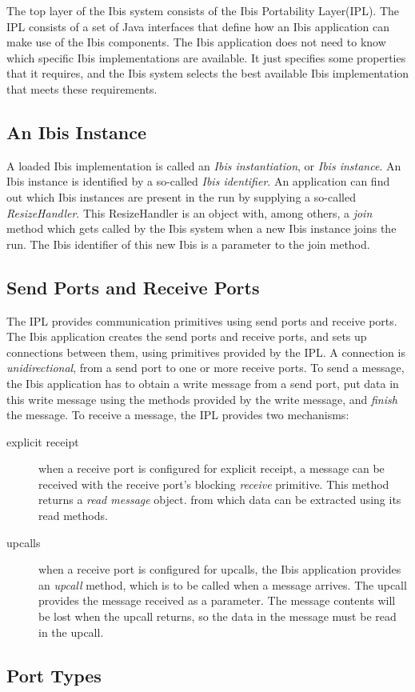 \documentclass[10pt]{article}
\newcommand{\mysubsection}[1]{\subsection{#1}\label{#1}}
\begin{document}
The top layer of the Ibis system consists of the Ibis Portability Layer(IPL).
The IPL consists of a set of Java interfaces that define how an Ibis application
can make use of the Ibis components.
The Ibis application does not need to know which specific Ibis implementations are
available.
It just specifies some properties that it requires, and the Ibis system
selects the best available Ibis implementation that meets these requirements.
 
\mysubsection{An Ibis Instance}

A loaded Ibis implementation is called an \emph{Ibis instantiation}, or 
\emph{Ibis instance}.
An Ibis instance is identified by a so-called
\emph{Ibis identifier}.
An application can find out which Ibis instances are present in the run
by supplying a so-called \emph{ResizeHandler}.
This ResizeHandler is an object with, among others, a \emph{join} method
which gets called by the Ibis system when a new Ibis instance joins the
run.
The Ibis identifier of this new Ibis is a parameter to the join method.

\mysubsection{Send Ports and Receive Ports}

The IPL provides communication primitives using send ports and receive ports.
The Ibis application creates the send ports and receive ports, and sets up
connections between them, using primitives provided by the IPL.
A connection is \emph{unidirectional}, from a send port to one or more
receive ports.
To send a message, the Ibis application has to obtain a
write message from a send port, put data in this write message using
the methods provided by the write message, and \emph{finish} the
message.
To receive a message, the IPL provides two mechanisms:
\begin{description}
\item[explicit receipt]
when a receive port is configured for explicit receipt, a message can be
received with the receive port's blocking \emph{receive} primitive.
This method returns a \emph{read message} object. from which data can
be extracted using its read methods.
\item[upcalls]
when a receive port is configured for upcalls, the Ibis application provides
an \emph{upcall} method, which is to be called when a message arrives.
The upcall provides the message received as a parameter.
The message contents will be lost when the upcall returns, so the data
in the message must be read in the upcall.
\end{description}

\mysubsection{Port Types}
\end{document}
